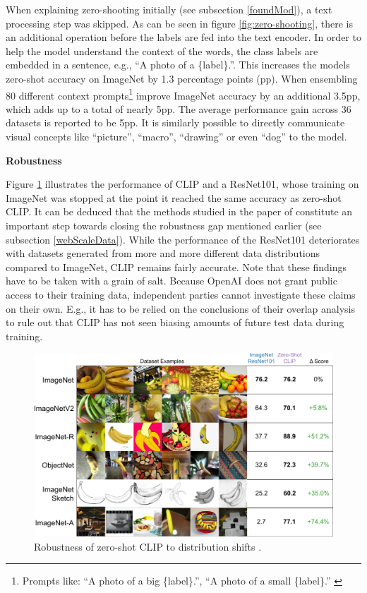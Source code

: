 \documentclass[
]{krantz}
\begin{document}
When explaining zero-shooting initially (see subsection \ref{foundMod}), a text processing step was skipped.
As can be seen in figure \ref{fig:zero-shooting}, there is an additional operation before the labels are fed into the text encoder.
In order to help the model understand the context of the words, the class labels are embedded in a sentence, e.g., ``A photo of a \{label\}.''.
This increases the models zero-shot accuracy on ImageNet by 1.3 percentage points (pp).
When ensembling 80 different context prompts\footnote{Prompts like: ``A photo of a big \{label\}.'', ``A photo of a small \{label\}.'' \citep{radford2021learning}} \citet{radford2021learning} improve ImageNet accuracy by an additional 3.5pp, which adds up to a total of nearly 5pp.
The average performance gain across 36 datasets is reported to be 5pp.
It is similarly possible to directly communicate visual concepts like ``picture'', ``macro'', ``drawing'' or even ``dog'' to the model.

\textbf{Robustness}

Figure \ref{fig:performance-clip} illustrates the performance of CLIP and a ResNet101, whose training on ImageNet was stopped at the point it reached the same accuracy as zero-shot CLIP.
It can be deduced that the methods studied in the paper of \citet{radford2021learning} constitute an important step towards closing the robustness gap mentioned earlier (see subsection \ref{webScaleData}).
While the performance of the ResNet101 deteriorates with datasets generated from more and more different data distributions compared to ImageNet, CLIP remains fairly accurate.
Note that these findings have to be taken with a grain of salt.
Because OpenAI does not grant public access to their training data, independent parties cannot investigate these claims on their own.
E.g., it has to be relied on the conclusions of their overlap analysis to rule out that CLIP has not seen biasing amounts of future test data during training.

\begin{figure}

{\centering \includegraphics[width=1\linewidth]{figures/02-04-text-support-img/performance-clip} 

}

\caption{Robustness of zero-shot CLIP to distribution shifts \citep{radford2021learning}.}\label{fig:performance-clip}
\end{figure}
\end{document}

